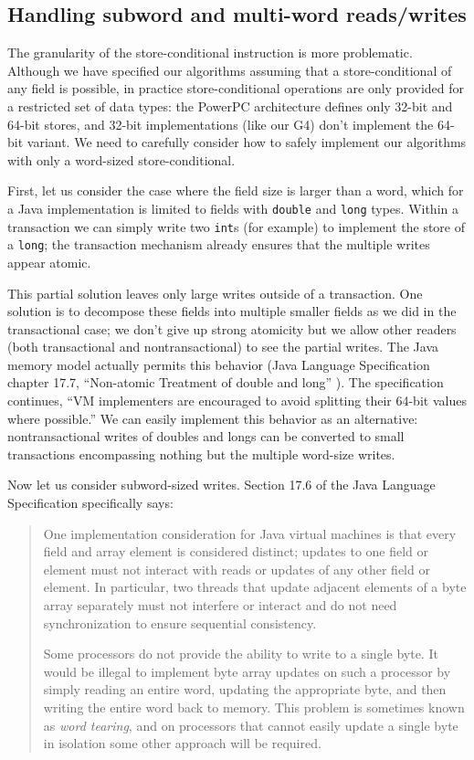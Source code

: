 \subsection{Handling subword and multi-word reads/writes}
\label{sec:multiword}
The granularity of the store-conditional instruction is more
problematic.  Although we have specified our algorithms assuming that
a store-conditional of any field is possible, in practice
store-conditional operations are only provided for a restricted set of
data types: the PowerPC architecture defines only 32-bit and 64-bit
stores, and 32-bit implementations (like our G4) don't implement the 64-bit
variant.  We need to carefully consider how to safely implement our
algorithms with only a word-sized store-conditional.

First, let us consider the case where the field size is larger than a
word, which for a Java implementation is limited to fields with
\texttt{double} and \texttt{long} types.  Within a transaction we can
simply write two \texttt{int}s (for example) to implement the store of
a \texttt{long}; the transaction mechanism already ensures that the
multiple writes appear atomic.

This partial solution leaves only large writes outside of a transaction.  One
solution is to decompose these fields into multiple smaller fields as
we did in the transactional case; we don't give up strong atomicity
but we allow other readers (both transactional and nontransactional)
to see the partial writes.  The Java memory model actually permits
this behavior (Java Language Specification chapter 17.7,
``Non-atomic Treatment of double and long'' \cite{JLS3}).  The specification
continues, ``VM implementers are encouraged to avoid splitting their
64-bit values where possible.''  We can easily implement this behavior
as an alternative: nontransactional writes of doubles and longs can be
converted to small transactions encompassing nothing but the multiple
word-size writes.

Now let us consider subword-sized writes.  Section 17.6 of the Java
Language Specification specifically says:
\begin{quote}
One implementation consideration for Java virtual machines is that
every field and array element is considered distinct; updates to one
field or element must not interact with reads or updates of any other
field or element. In particular, two threads that update adjacent
elements of a byte array separately must not interfere or interact and
do not need synchronization to ensure sequential consistency.

Some processors do not provide the ability to write to a single
byte. It would be illegal to implement byte array updates on such a
processor by simply reading an entire word, updating the appropriate
byte, and then writing the entire word back to memory. This problem is
sometimes known as \textit{word tearing}, and on processors that cannot easily
update a single byte in isolation some other approach will be
required.
\end{quote}

